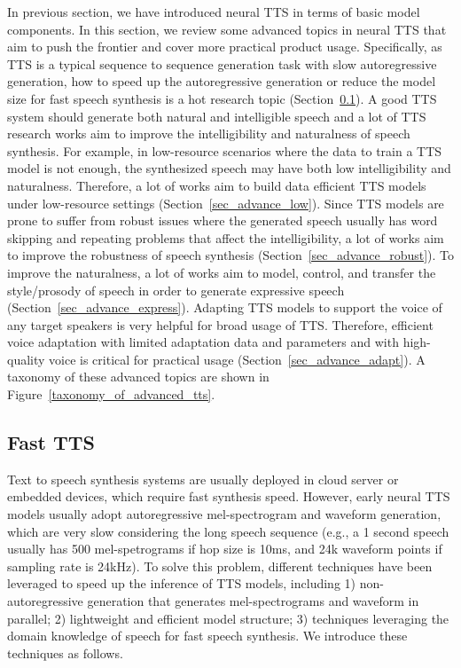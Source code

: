 \documentclass{article}
\begin{document}
In previous section, we have introduced neural TTS in terms of basic model components. In this section, we review some advanced topics in neural TTS that aim to push the frontier and cover more practical product usage. Specifically, as TTS is a typical sequence to sequence generation task with slow autoregressive generation, how to speed up the autoregressive generation or reduce the model size for fast speech synthesis is a hot research topic (Section~\ref{sec_advance_fast}). A good TTS system should generate both natural and intelligible speech and a lot of TTS research works aim to improve the intelligibility and naturalness of speech synthesis. For example, in low-resource scenarios where the data to train a TTS model is not enough, the synthesized speech may have both low intelligibility and naturalness. Therefore, a lot of works aim to build data efficient TTS models under low-resource settings (Section~\ref{sec_advance_low}). Since TTS models are prone to suffer from robust issues where the generated speech usually has word skipping and repeating problems that affect the intelligibility, a lot of works aim to improve the robustness of speech synthesis (Section~\ref{sec_advance_robust}). To improve the naturalness, a lot of works aim to model, control, and transfer the style/prosody of speech in order to generate expressive speech (Section~\ref{sec_advance_express}). Adapting TTS models to support the voice of any target speakers is very helpful for broad usage of TTS. Therefore, efficient voice adaptation with limited adaptation data and parameters and with high-quality voice is critical for practical usage (Section~\ref{sec_advance_adapt}). A taxonomy of these advanced topics are shown in Figure~\ref{taxonomy_of_advanced_tts}.


\subsection{Fast TTS}
\label{sec_advance_fast}
Text to speech synthesis systems are usually deployed in cloud server or embedded devices, which require fast synthesis speed. However, early neural TTS models usually adopt autoregressive mel-spectrogram and waveform generation, which are very slow considering the long speech sequence (e.g., a 1 second speech usually has 500 mel-spetrograms if hop size is 10ms, and 24k waveform points if sampling rate is 24kHz). To solve this problem, different techniques have been leveraged to speed up the inference of TTS models, including 1) non-autoregressive generation that generates mel-spectrograms and waveform in parallel; 2) lightweight and efficient model structure; 3) techniques leveraging the domain knowledge of speech for fast speech synthesis. We introduce these techniques as follows.
\end{document}
